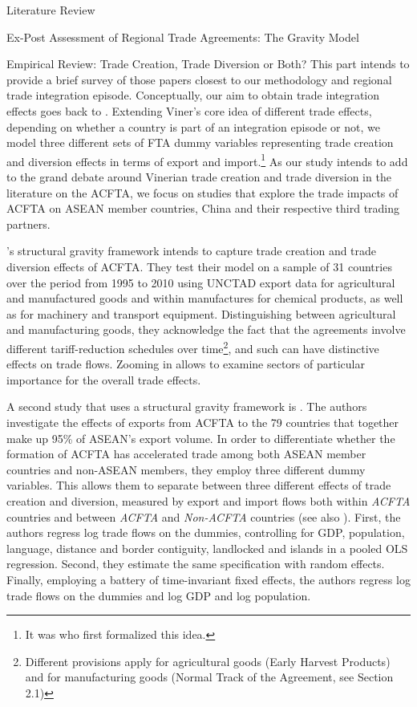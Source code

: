 \begin{section}{Literature Review}
\begin{subsection}{Ex-Post Assessment of Regional Trade Agreements: The Gravity Model}
\begin{subsubsection}{Empirical Review: Trade Creation, Trade Diversion or Both?}
This part intends to provide a brief survey of those papers closest to our methodology and regional trade integration episode. Conceptually, our aim to obtain trade integration effects goes back to \cite{viner1950}. Extending Viner's core idea of different trade effects, depending on whether a country is part of an integration episode or not, we model three different sets of FTA dummy variables representing trade creation and diversion effects in terms of export and import.\footnote{It was \cite{endoh1999} who first formalized this idea.} As our study intends to add to the grand debate around Vinerian trade creation and trade diversion in the literature on the ACFTA, we focus on studies that explore the trade impacts of ACFTA on ASEAN member countries, China and their respective third trading partners. 

\cite{smz2014}'s structural gravity framework intends to capture trade creation and trade diversion effects of ACFTA. They test their model on a sample of 31 countries over the period from 1995 to 2010 using UNCTAD export data for agricultural and manufactured goods and within manufactures for chemical products, as well as for machinery and transport equipment. Distinguishing between agricultural and manufacturing goods, they acknowledge the fact that the agreements involve different tariff-reduction schedules over time\footnote{Different provisions apply for agricultural goods (Early Harvest Products) and for manufacturing goods (Normal Track of the Agreement, see Section 2.1)}, and such can have distinctive effects on trade flows. Zooming in allows to examine sectors of particular importance for the overall trade effects.

A second study that uses a structural gravity framework is \cite{wla_2021}. The authors investigate the effects of exports from ACFTA to the 79 countries that together make up 95\% of ASEAN's export volume. In order to differentiate whether the formation of ACFTA has accelerated trade among both ASEAN member countries and non-ASEAN members, they employ three different dummy variables.  This allows them to separate between three different effects of trade creation and diversion, measured by export and import flows both within \textit{ACFTA} countries and between \textit{ACFTA} and \textit{Non-ACFTA} countries (see also \cite{carrere_2006}). First, the authors regress log trade flows on the dummies, controlling for GDP, population, language, distance and border contiguity, landlocked and islands in a pooled OLS regression. Second, they estimate the same specification with random effects. Finally, employing a battery of time-invariant fixed effects, the authors regress log trade flows on the dummies and log GDP and log population. 



\end{subsubsection}
\end{subsection}
\end{section}
